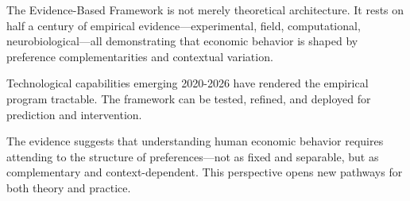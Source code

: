 \documentclass[12pt,oneside]{book}
\begin{document}
The Evidence-Based Framework is not merely theoretical architecture. It rests on half a century
of empirical evidence—experimental, field, computational, neurobiological—all demonstrating that
economic behavior is shaped by preference complementarities and contextual variation.

Technological capabilities emerging 2020-2026 have rendered the empirical program tractable.
The framework can be tested, refined, and deployed for prediction and intervention.

The evidence suggests that understanding human economic behavior requires attending to the
structure of preferences—not as fixed and separable, but as complementary and context-dependent.
This perspective opens new pathways for both theory and practice.

\end{document}

